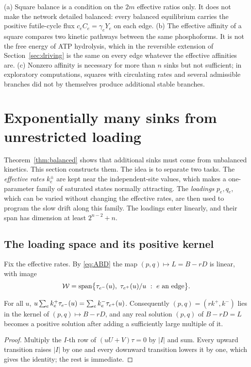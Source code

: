 \begin{remark}\label{rem:balance}
(a) Square balance is a condition on the \(2m\) effective ratios only. It does not make the
network detailed balanced: every balanced equilibrium carries the positive futile-cycle flux
\(c_eC_e=\gamma_eY_e\) on each edge. (b) The effective affinity of a square compares two
kinetic pathways between the same phosphoforms. It is not the free energy of ATP hydrolysis,
which in the reversible extension of Section~\ref{sec:driving} is the same on every edge
whatever the effective affinities are. (c) Nonzero affinity is necessary for more than \(n\)
sinks but not sufficient; in exploratory computations, squares with circulating rates and
several admissible branches did not by themselves produce additional stable branches.
\end{remark}

\section{Exponentially many sinks from unrestricted loading}\label{sec:lower}
Theorem~\ref{thm:balanced} shows that additional sinks must come from unbalanced kinetics.
This section constructs them. The idea is to separate two tasks. The \emph{effective rates}
\(k_e^\pm\) are kept near the independent-site values, which makes a one-parameter family of
saturated states normally attracting. The \emph{loadings} \(p_e,q_e\), which can be varied
without changing the effective rates, are then used to program the slow drift along this
family. The loadings enter linearly, and their span has dimension at least \(2^{n-2}+n\).

\subsection{The loading space and its positive kernel}
Fix the effective rates. By \eqref{eq:ABD} the map \((p,q)\mapsto L=B-rD\) is linear, with
image
\begin{equation}\label{eq:W}
 \mathcal W=\operatorname{span}\bigl\{\tau_{e^{-}}(u),\ \tau_{e^{+}}(u)/u\ :\ e\ \text{an edge}\bigr\}.
\end{equation}
\begin{lemma}\label{lem:kernel}
For all \(u\),
\(u\sum_ek_e^+\tau_{e^{-}}(u)=\sum_ek_e^-\tau_{e^{+}}(u)\). Consequently
\((p,q)=(rk^+,k^-)\) lies in the kernel of \((p,q)\mapsto B-rD\), and any real solution
\((p,q)\) of \(B-rD=L\) becomes a positive solution after adding a sufficiently large multiple
of it.
\end{lemma}
\begin{proof}
Multiply the \(I\)-th row of \((uU+V)\tau=0\) by \(|I|\) and sum. Every upward transition
raises \(|I|\) by one and every downward transition lowers it by one, which gives the
identity; the rest is immediate.
\end{proof}

